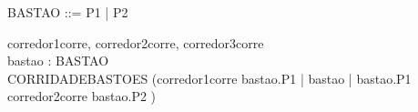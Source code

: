 \begin{zed}
BASTAO ::= P1 | P2
\end{zed}
\begin{circus}
\circchannel corredor1corre, corredor2corre, corredor3corre \\
\circchannel bastao : BASTAO \\
\circprocess CORRIDADEBASTOES \circdef \circbegin
	\circspot (corredor1corre \then bastao.P1 \then \Skip \lpar | \lchanset bastao \rchanset | \rpar bastao.P1 \then corredor2corre \then bastao.P2 \then \Skip) %
	\\
\circend
\end{circus}
